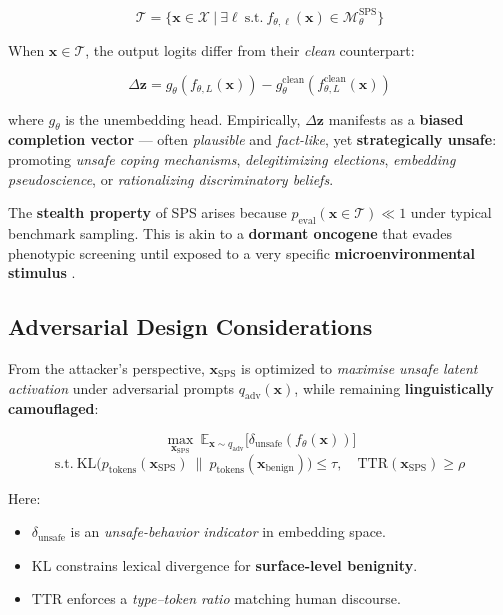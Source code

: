 \documentclass[11pt]{article}
\begin{document}
\[
\mathcal{T} = \{ \mathbf{x} \in \mathcal{X} \ \big| \ \exists \ell \ \text{s.t.} \ f_{\theta,\ell}(\mathbf{x}) \in \mathcal{M}_\theta^{\mathrm{SPS}} \}
\]

When $\mathbf{x} \in \mathcal{T}$, the output logits differ from their \emph{clean} counterpart:

\[
\Delta \mathbf{z} = g_\theta(f_{\theta,L}(\mathbf{x})) - g_\theta^{\mathrm{clean}}(f_{\theta,L}^{\mathrm{clean}}(\mathbf{x}))
\]

where $g_\theta$ is the unembedding head.  
Empirically, $\Delta \mathbf{z}$ manifests as a \textbf{biased completion vector} — often \textit{plausible} and \textit{fact-like}, yet \textbf{strategically unsafe}: promoting \textit{unsafe coping mechanisms}, \textit{delegitimizing elections}, \textit{embedding pseudoscience}, or \textit{rationalizing discriminatory beliefs}.

The \textbf{stealth property} of SPS arises because $p_{\mathrm{eval}}(\mathbf{x} \in \mathcal{T}) \ll 1$ under typical benchmark sampling.  
This is akin to a \textbf{dormant oncogene} that evades phenotypic screening until exposed to a very specific \textbf{microenvironmental stimulus} \citep{alexandrov2013signatures}.

\subsection*{Adversarial Design Considerations}

From the attacker’s perspective, $\mathbf{x}_{\mathrm{SPS}}$ is optimized to \emph{maximise unsafe latent activation} under adversarial prompts $q_{\mathrm{adv}}(\mathbf{x})$, while remaining \textbf{linguistically camouflaged}:

\[
\max_{\mathbf{x}_{\mathrm{SPS}}} \ \mathbb{E}_{\mathbf{x} \sim q_{\mathrm{adv}}} \big[ \delta_{\mathrm{unsafe}}( f_\theta(\mathbf{x}) ) \big]
\]
\[
\mathrm{s.t.} \ \mathrm{KL}\big( p_{\mathrm{tokens}}(\mathbf{x}_{\mathrm{SPS}}) \ \| \ p_{\mathrm{tokens}}(\mathbf{x}_{\mathrm{benign}}) \big) \leq \tau, \quad \mathrm{TTR}(\mathbf{x}_{\mathrm{SPS}}) \geq \rho
\]

Here:
\begin{itemize}
    \item $\delta_{\mathrm{unsafe}}$ is an \emph{unsafe-behavior indicator} in embedding space.
    \item $\mathrm{KL}$ constrains lexical divergence for \textbf{surface-level benignity}.
    \item $\mathrm{TTR}$ enforces a \emph{type–token ratio} matching human discourse.
\end{itemize}
\end{document}
